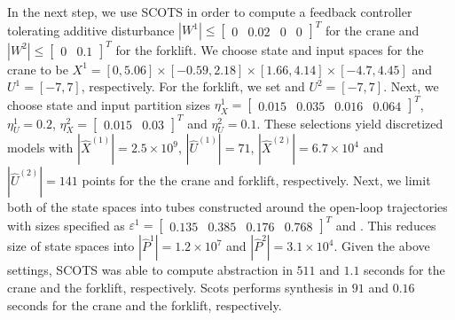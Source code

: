 In the next step, we use SCOTS in order to compute a feedback controller tolerating additive disturbance $|W^1|\leq\begin{bmatrix}0&0.02&0&0\end{bmatrix}^T$ for the crane and $|W^2|\leq\begin{bmatrix}0&0.1\end{bmatrix}^T$ for the forklift. %
We choose state and input spaces for the crane to be $X^{1}=[0,5.06]\times[-0.59,2.18]\times[1.66,4.14]\times[-4.7,4.45]$ and $U^{1}=[-7,7]$, respectively. For the forklift, we set  and $U^{2}=[-7,7]$. %
Next, we choose state and input partition sizes $\eta_{{X}}^{1}=\begin{bmatrix}0.015&0.035&0.016&0.064\end{bmatrix}^T$, $\eta_{U}^1=0.2$,  $\eta_{{X}}^2=\begin{bmatrix}0.015&0.03\end{bmatrix}^T$ and $\eta_{U}^2=0.1$. These selections yield discretized models with $|\hat X^{(1)}|=2.5\times 10^9$, $|\hat U^{(1)}|=71$, $|\hat X^{(2)}|=6.7\times 10^4$ and $|\hat U^{(2)}|=141$ points for the the crane and forklift, respectively. Next, we limit both of the state spaces into tubes constructed around the open-loop trajectories with sizes specified as $\varepsilon^{1}=\begin{bmatrix}0.135&0.385&0.176 &0.768\end{bmatrix}^T$ and . This reduces size of state spaces into $|\hat P^{1}|=1.2\times 10^7$ and $|\hat P^{2}|=3.1\times 10^4$. Given the above settings, SCOTS was able to compute abstraction in $511$ and $1.1$ seconds for the crane and the forklift, respectively. Scots performs synthesis in $91$ and $0.16$ seconds for the crane and the forklift, respectively.
			
